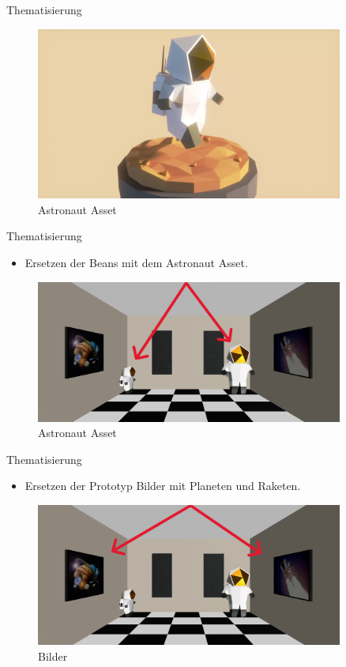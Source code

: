 \documentclass{beamer}
\begin{document}
\begin{frame}{Thematisierung}
\begin{figure}
    \centering
\includegraphics[width=0.9\textwidth, keepaspectratio]{astro}
\caption{Astronaut Asset \cite{astronaut}}
\end{figure}
\end{frame}


\begin{frame}{Thematisierung}
\begin{itemize}
\item Ersetzen der Beans mit dem Astronaut Asset.
\end{itemize}
\begin{figure}
    \centering
\includegraphics[width=0.9\textwidth, keepaspectratio]{thema1}
\caption{Astronaut Asset \cite{astronaut}}
\end{figure}
\end{frame}


\begin{frame}{Thematisierung}
\begin{itemize}
\item Ersetzen der Prototyp Bilder mit Planeten und Raketen.
\end{itemize}
\begin{figure}
    \centering
\includegraphics[width=0.9\textwidth, keepaspectratio]{thema2}
\caption{Bilder \cite{planet} \cite{rakete}}
\end{figure}
\end{frame}
\end{document}
